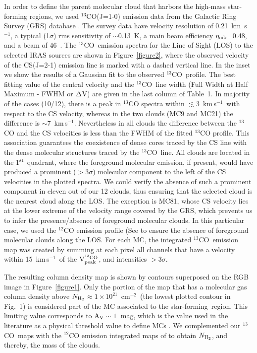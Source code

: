 \documentclass[iop]{emulateapj}
\newcommand{\mum}{$\mu$m}
\newcommand{\starf}{star-forming}
\newcommand{\co}{$^{13}$CO}
\newcommand{\kms}{km\,s$^{-1}$}
\newcommand{\cmsq}{cm$^{-2}$}
\newcommand{\nhtwo}{$N_{{\rm H}_2}$}
\begin{document}
In order to define the parent molecular cloud that harbors the
high-mass star-forming regions, we used $^{13}$CO(J=1-0)
emission data from the Galactic Ring Survey (GRS) database
\citep{jackson+06}. The survey data
have velocity resolution of 0.21~km~s$^{-1}$, a typical (1$\sigma$) rms
sensitivity of $\sim$0.13~K, a main beam efficiency $\eta_{\rm mb}$=0.48, 
and a beam of 46\arcsec\ \citep{jackson+06}.
The \co\ emission spectra for the Line of Sight (LOS) to the
selected IRAS sources are shown in Figure~\ref{figure2}, where the observed velocity
of the CS(J=2-1) emission line \citep{bronfman+96} is marked with a 
dashed vertical line. 
In the inset we show the results of a Gaussian fit to the observed \co\ profile.
The best fitting value of the central velocity and the \co\ line width (Full Width at Half
Maximum - FWHM or $\rm\Delta$V) are given in the last column of Table~1.
In majority of the cases (10/12), there is a peak in $^{13}$CO spectra 
within $\lesssim$3~\kms\ with respect to the CS velocity, whereas in 
the two clouds (MC9 and MC21) the difference is $\sim$7~\kms. Nevertheless 
in all clouds the difference between the $^{13}$CO and the CS velocities 
is less than the FWHM of the fitted $^{13}$CO profile. 
This association guarantees the coexistence of dense cores 
traced by the CS line with the dense molecular structures traced by the \co\ line. 
All clouds are located in the 1$^{\rm st}$ quadrant, where the foreground 
molecular emission, if present, would have produced a prominent ($>3\sigma$) 
molecular component to the left of the CS velocities in the plotted spectra. 
We could verify the absence of such a prominent component in eleven out of our 12 clouds,
thus ensuring that the selected cloud is the nearest cloud along the LOS.
The exception is MC81, whose CS velocity lies at the lower extreme of the velocity
range covered by the GRS, which prevents us to infer the presence/absence of
foreground molecular clouds. In this particular case, we used the $^{12}$CO 
emission profile (See \citep[Figure~1 and Figure~\ref{figure2} in][ respectively]{clemens+86,dame+01}
to ensure the absence of foreground molecular clouds along the LOS.
For each MC, the integrated \co\ emission map was created by summing at each pixel
all channels that have a velocity within 15~\kms\ of the $\rm V^{^{13}{\rm CO}}_{\rm peak}$,
and intensities $>3\sigma$.

The resulting column density map is shown by contours superposed on the 
RGB image in Figure~\ref{figure1}.  %
Only the portion of the map that has a molecular gas column density above
\nhtwo$\approx 1\times10^{21}$~\cmsq\ (the lowest plotted contour in Fig.~1)
is considered part of the MC associated to the \starf~region. This limiting value 
corresponds to $\rm A_{\rm V}\sim1$~mag, which is the value used in the 
literature as a physical threshold value to define MCs \citep{bolatto+13}. 
%
We complemented our \co\ maps with the $^{12}$CO emission integrated maps 
of \citet{sanders+86} to obtain \nhtwo, and thereby, the mass of the clouds.\\
\end{document}
